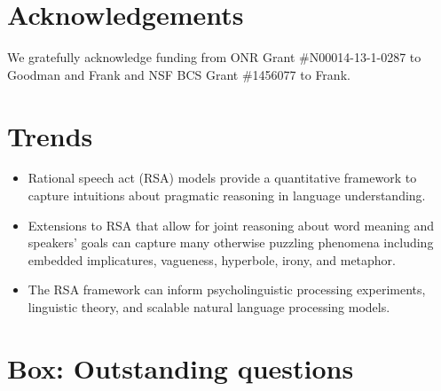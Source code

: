 \documentclass[]{elsarticle}
\begin{document}
\section{Acknowledgements}

We gratefully acknowledge funding from ONR Grant \#N00014-13-1-0287 to Goodman and Frank and NSF BCS Grant \#1456077 to Frank.




\newpage

\appendix




\section{Trends}\label{trends-box}

\begin{itemize}
\item Rational speech act (RSA) models provide a quantitative framework to
  capture intuitions about pragmatic reasoning in language
  understanding.
\item Extensions to RSA that allow for joint reasoning about word meaning
  and speakers' goals can capture many otherwise puzzling phenomena
  including embedded implicatures, vagueness, hyperbole, irony, and
  metaphor.
\item The RSA framework can inform psycholinguistic processing experiments,
  linguistic theory, and scalable natural language processing models.
\end{itemize}

\section{Box: Outstanding questions}\label{box-outstanding-questions}
\end{document}
